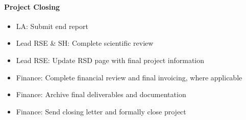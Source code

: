 \paragraph{Project Closing}

\begin{itemize}
    \item[$\square$] LA: Submit end report
    \item[$\square$] Lead RSE \& SH: Complete scientific review
    \item[$\square$] Lead RSE: Update RSD page with final project information
    \item[$\square$] Finance: Complete financial review and final invoicing, where applicable
    \item[$\square$] Finance: Archive final deliverables and documentation
    \item[$\square$] Finance: Send closing letter and formally close project
\end{itemize}